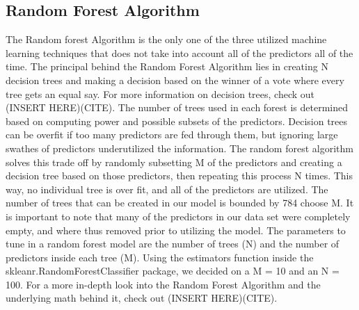 \documentclass[11pt, oneside]{article}   	%
\begin{document}
\subsection{Random Forest Algorithm}
The Random forest Algorithm is the only one of the three utilized machine learning techniques that does not take into account all of the predictors all of the time. The principal behind the Random Forest Algorithm lies in creating N decision trees and making a decision based on the winner of a vote where every tree gets an equal say. For more information on decision trees, check out (INSERT HERE)(CITE). The number of trees used in each forest is determined based on computing power and possible subsets of the predictors. Decision trees can be overfit if too many predictors are fed through them, but ignoring large swathes of predictors underutilized the information. The random forest algorithm solves this trade off by randomly subsetting M of the predictors and creating a decision tree based on those predictors, then repeating this process N times. This way, no individual tree is over fit, and all of the predictors are utilized. The number of trees that can be created in our model is bounded by 784 choose M.  It is important to note that many of the predictors in our data set were completely empty, and where thus removed prior to utilizing the model. The parameters to tune in a random forest model are the number of trees (N) and the number of predictors inside each tree (M). Using the estimators function inside the skleanr.RandomForestClassifier package, we decided on a M = 10 and an N = 100. For a more in-depth look into the Random Forest Algorithm and the underlying math behind it, check out (INSERT HERE)(CITE).

\end{document}

